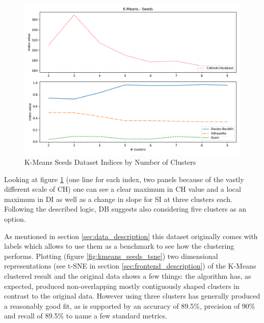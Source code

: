 \begin{figure}[H]
\caption{K-Means Seeds Dataset Indices by Number of Clusters}
\begin{center}
\includegraphics[width=1.0\textwidth]{images/kmeans_seeds_index_plot.pdf}
\end{center}
\label{fig:kmeans_seeds_comparison_plot}
\end{figure}

\vspace{-0.5cm}
Looking at figure \ref{fig:kmeans_seeds_comparison_plot} (one line for each index, two panels because of the vastly different scale of \gls{CH}) one can see a clear maximum in \gls{CH} value and a local maximum in \gls{DI} as well as a change in slope for \gls{SI} at three clusters each. Following the described logic, \gls{DB} suggests also considering five clusters as an option. 

As mentioned in section \ref{sec:data_description} this dataset originally comes with labels which allows to use them as a benchmark to see how the clustering performs. Plotting (figure \ref{fig:kmeans_seeds_tsne}) two dimensional representations (see t-SNE in section \ref{sec:frontend_description}) of the K-Means clustered result and the original data shows a few things: the algorithm has, as expected, produced non-overlapping mostly contiguously shaped clusters in contrast to the original data. However using three clusters has generally produced a reasonably good fit, as is supported by an accuracy of 89.5\%, precision of 90\% and recall of 89.5\% to name a few standard metrics.

